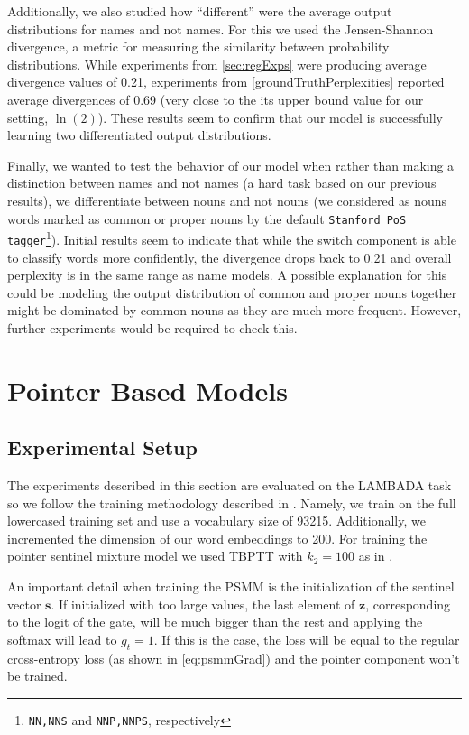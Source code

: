 Additionally, we also studied how ``different'' were the average output distributions for names and not names. For this we used the Jensen-Shannon divergence, a metric for measuring the similarity between probability distributions. While experiments from \autoref{sec:regExps} were producing average divergence values of 0.21, experiments from \autoref{groundTruthPerplexities} reported average divergences of 0.69 (very close to the its upper bound value for our setting, $\ln(2)$). These results seem to confirm that our model is successfully learning two differentiated output distributions.

Finally, we wanted to test the behavior of our model when rather than making a distinction between names and not names (a hard task based on our previous results), we differentiate between nouns and not nouns (we considered as nouns words marked as common or proper nouns by the default \texttt{Stanford PoS tagger}\footnote{\texttt{NN,NNS} and \texttt{NNP,NNPS}, respectively}). Initial results seem to indicate that while the switch component is able to classify words more confidently, the divergence drops back to 0.21 and overall perplexity is in the same range as name models. A possible explanation for this could be modeling the output distribution of common and proper nouns together might be dominated by common nouns as they are much more frequent. However, further experiments would be required to check this.

\section{Pointer Based Models}
\label{sec:pointerExps}

\subsection{Experimental Setup}

The experiments described in this section are evaluated on the LAMBADA task so we follow the training methodology described in \cite{paperno2016lambada}. Namely, we train on the full lowercased training set and use a vocabulary size of 93215. Additionally, we incremented the dimension of our word embeddings to 200. For training the pointer sentinel mixture model we used TBPTT with $k_2=100$ as in \cite{merity2016pointer}.

An important detail when training the PSMM is the initialization of the sentinel vector $\mathbf{s}$. If initialized with too large values, the last element of $\mathbf{z}$, corresponding to the logit of the gate, will be much bigger than the rest and applying the softmax will lead to $g_t=1$. If this is the case, the loss will be equal to the regular cross-entropy loss (as shown in \autoref{eq:psmmGrad}) and the pointer component won't be trained.

